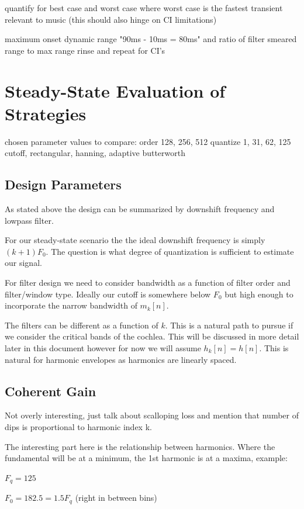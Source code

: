 \documentclass [11pt, proquest] {uwthesis}[2015/03/03]
\begin{document}
quantify for best case and worst case where worst case is the fastest transient relevant to music (this should also hinge on CI limitations)

maximum onset dynamic range "90ms - 10ms = 80ms"
and ratio of filter smeared range to max range
rinse and repeat for CI's

\section{Steady-State Evaluation of Strategies}

chosen parameter values to compare:
order 128, 256, 512
quantize 1, 31, 62, 125
cutoff, rectangular, hanning, adaptive butterworth

\subsection{Design Parameters}

As stated above the design can be summarized by downshift frequency and lowpass filter.

For our steady-state scenario the the ideal downshift frequency is simply $(k+1)F_0$.  The question is what degree of quantization is sufficient to estimate our signal.

For filter design we need to consider bandwidth as a function of filter order and filter/window type.  Ideally our cutoff is somewhere below $F_0$ but high enough to incorporate the narrow bandwidth of $m_k[n]$.

The filters can be different as a function of $k$.  This is a natural path to pursue if we consider the critical bands of the cochlea.  This will be discussed in more detail later in this document however for now we will assume $h_k[n] = h[n]$.  This is natural for harmonic envelopes as harmonics are linearly spaced.

\subsection{Coherent Gain}

Not overly interesting, just talk about scalloping loss and mention that number of dips is proportional to harmonic index k.

The interesting part here is the relationship between harmonics.  Where the fundamental will be at a minimum, the 1st harmonic is at a maxima, example:

$F_q = 125$

$F_0 = 182.5 = 1.5 F_q$ (right in between bins)
\end{document}
